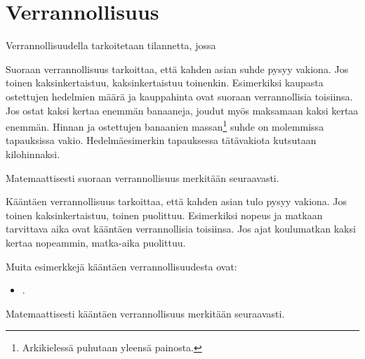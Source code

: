\chapter{Verrannollisuus}

Verrannollisuudella tarkoitetaan tilannetta, jossa 

Suoraan verrannollisuus tarkoittaa, että kahden asian suhde pysyy vakiona. Jos toinen kaksinkertaistuu, kaksinkertaistuu toinenkin. Esimerkiksi kaupasta ostettujen hedelmien määrä ja kauppahinta ovat suoraan verrannollisia toisiinsa. Jos ostat kaksi kertaa enemmän banaaneja, joudut myös maksamaan kaksi kertaa enemmän. Hinnan ja ostettujen banaanien massan\footnote{Arkikielessä puhutaan yleensä painosta.} suhde on molemmissa tapauksissa vakio. Hedelmäesimerkin tapauksessa tätävakiota kutsutaan kilohinnaksi.

Matemaattisesti suoraan verrannollisuus merkitään seuraavasti.


Kääntäen verrannollisuus tarkoittaa, että kahden asian tulo pysyy vakiona. Jos toinen kaksinkertaistuu, toinen puolittuu. Esimerkiksi nopeus ja matkaan tarvittava aika ovat kääntäen verrannollisia toisiinsa. Jos ajat koulumatkan kaksi kertaa nopeammin, matka-aika puolittuu.

Muita esimerkkejä kääntäen verrannollisuudesta ovat:
\begin{itemize}
    \item .
\end{itemize}

Matemaattisesti kääntäen verrannollisuus merkitään seuraavasti.

